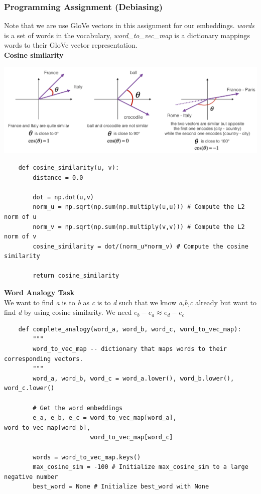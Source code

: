 \documentclass[11pt, a4paper]{article}
\begin{document}
\begin{spacing}{1.1}
	\subsubsection{Programming Assignment (Debiasing)}
	Note that we are use GloVe vectors in this assignment for our embeddings. \textit{words} is a set of words in the vocabulary, \textit{word\_to\_vec\_map} is a dictionary mappings words to their GloVe vector representation. \vspace*{1mm}\\
	\textbf{Cosine similarity}
	\begin{center}
	\includegraphics[scale=.5]{cosine_sim}
	\end{center}
	\begin{lstlisting}
	def cosine_similarity(u, v):
		distance = 0.0

		dot = np.dot(u,v)
		norm_u = np.sqrt(np.sum(np.multiply(u,u))) # Compute the L2 norm of u
		norm_v = np.sqrt(np.sum(np.multiply(v,v))) # Compute the L2 norm of v
		cosine_similarity = dot/(norm_u*norm_v) # Compute the cosine similarity
		
		return cosine_similarity \end{lstlisting} \vspace*{1mm}
	\textbf{Word Analogy Task} \\
	We want to find \textit{a} is to \textit{b} as \textit{c} is to \textit{d} such that we know \textit{a,b,c} already but want to find \textit{d} by using cosine similarity. We need $e_b - e_a \approx e_d - e_c$
	\begin{lstlisting}
	def complete_analogy(word_a, word_b, word_c, word_to_vec_map):
		"""
		word_to_vec_map -- dictionary that maps words to their corresponding vectors. 
		"""
		word_a, word_b, word_c = word_a.lower(), word_b.lower(), word_c.lower()
		
		# Get the word embeddings
		e_a, e_b, e_c = word_to_vec_map[word_a], word_to_vec_map[word_b], 
		                word_to_vec_map[word_c]
		
		words = word_to_vec_map.keys()
		max_cosine_sim = -100 # Initialize max_cosine_sim to a large negative number
		best_word = None # Initialize best_word with None
		

\end{lstlisting}
\end{spacing}
\end{document}
